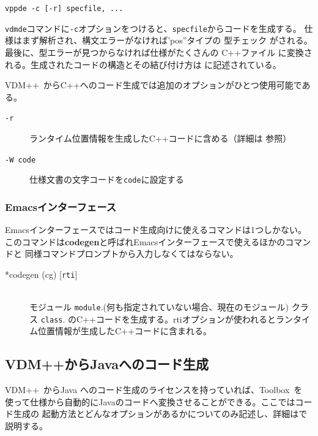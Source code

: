 \documentclass[\pformat,12pt]{jarticle}
\newcommand{\vdmslpp}{VDM++}
\newcommand{\Toolbox}{Toolbox}
\newcommand{\vdmde}{vppde}
\begin{document}
{\tt \vdmde\ -c [-r] specfile, ...}


{\tt vdmde}コマンドに{\tt -c}オプションをつけると、{\tt specfile}からコードを生成する。
仕様はまず解析され、構文エラーがなければ'pos''タイプの
型チェック がされる。最後に、型エラーが見つからなければ仕様がたくさんの
C++ファイル に変換される。生成されたコードの構造とその結び付け方は
に記述されている。

\vdmslpp\ からC++へのコード生成では追加のオプションがひとつ使用可能である。

\begin{description}
\item[{\tt -r}]
  ランタイム位置情報を生成したC++コードに含める（詳細は
  参照）

\item[{\tt -W code}] 仕様文書の文字コードを{\tt code}に設定する
\end{description}

\subsubsection{Emacsインターフェース}

Emacsインターフェースではコード生成向けに使えるコマンドは1つしかない。
このコマンドは\textbf{codegen}と呼ばれEmacsインターフェースで使えるほかのコマンドと
同様コマンドプロンプトから入力しなくてはならない。

\begin{description}
\item[*codegen (cg)  {[}{\tt rti}{]}] 
  \mbox{}\\
  {モジュール {\tt module}.(何も指定されていない場合、現在のモジュール) }
  {クラス {\tt class}}.  
  のC++コードを生成する。rtiオプションが使われるとランタイム位置情報が生成したC++コードに含まれる。
\end{description}

\newpage
\subsection{VDM++からJavaへのコード生成}\label{sec:cgjava}


\vdmslpp\ からJava へのコード生成のライセンスを持っていれば、\Toolbox\ を
使って仕様から自動的にJavaのコードへ変換させることができる。ここではコード生成の
起動方法とどんなオプションがあるかについてのみ記述し、詳細は\cite{CGJavaManPP-SCSK}で説明する。
\end{document}
